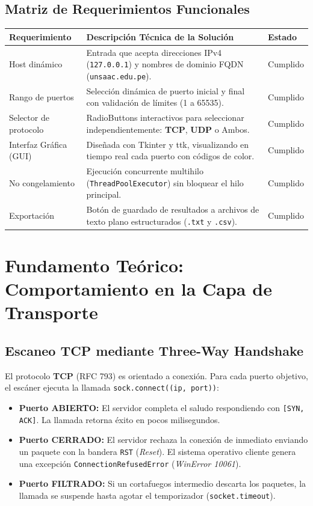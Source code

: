 \documentclass[10pt,a4paper]{article}
\newcommand{\TCP}{\textbf{TCP}}
\newcommand{\UDP}{\textbf{UDP}}
\begin{document}
\subsection{Matriz de Requerimientos Funcionales}
\begin{table}[h!]
\centering\small
\begin{tabularx}{\textwidth}{lXl}
\toprule
\textbf{Requerimiento} & \textbf{Descripción Técnica de la Solución} & \textbf{Estado} \\
\midrule
Host dinámico & Entrada que acepta direcciones IPv4 (\texttt{127.0.0.1}) y nombres de dominio FQDN (\texttt{unsaac.edu.pe}). & Cumplido \\
Rango de puertos & Selección dinámica de puerto inicial y final con validación de límites (1 a 65535). & Cumplido \\
Selector de protocolo & RadioButtons interactivos para seleccionar independientemente: \TCP{}, \UDP{} o Ambos. & Cumplido \\
Interfaz Gráfica (GUI) & Diseñada con Tkinter y ttk, visualizando en tiempo real cada puerto con códigos de color. & Cumplido \\
No congelamiento & Ejecución concurrente multihilo (\texttt{ThreadPoolExecutor}) sin bloquear el hilo principal. & Cumplido \\
Exportación & Botón de guardado de resultados a archivos de texto plano estructurados (\texttt{.txt} y \texttt{.csv}). & Cumplido \\
\bottomrule
\end{tabularx}
\end{table}

\section{Fundamento Teórico: Comportamiento en la Capa de Transporte}

\subsection{Escaneo \TCP{} mediante Three-Way Handshake}
El protocolo \TCP{} (RFC 793) es orientado a conexión. Para cada puerto objetivo, el escáner ejecuta la llamada \texttt{sock.connect((ip, port))}:
\begin{itemize}[leftmargin=*,itemsep=1pt]
    \item \textbf{Puerto ABIERTO:} El servidor completa el saludo respondiendo con \texttt{[SYN, ACK]}. La llamada retorna éxito en pocos milisegundos.
    \item \textbf{Puerto CERRADO:} El servidor rechaza la conexión de inmediato enviando un paquete con la bandera \texttt{RST} (\textit{Reset}). El sistema operativo cliente genera una excepción \texttt{ConnectionRefusedError} (\textit{WinError 10061}).
    \item \textbf{Puerto FILTRADO:} Si un cortafuegos intermedio descarta los paquetes, la llamada se suspende hasta agotar el temporizador (\texttt{socket.timeout}).
\end{itemize}
\end{document}

